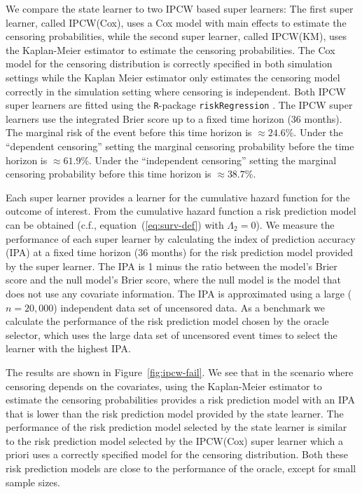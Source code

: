 \documentclass[numsec,webpdf,contemporary,medium,namedate]{oup-authoring-template}%
\theoremstyle{thmstyleone}%
\theoremstyle{thmstyletwo}%
\theoremstyle{thmstylethree}%
\newcommand{\1}{\mathds{1}}
\begin{document}
We compare the state learner to two IPCW based super learners: The
first super learner, called IPCW(Cox), uses a Cox model with main
effects to estimate the censoring probabilities, while the second
super learner, called IPCW(KM), uses the Kaplan-Meier estimator to
estimate the censoring probabilities. The Cox model for the censoring
distribution is correctly specified in both simulation settings while
the Kaplan Meier estimator only estimates the censoring model
correctly in the simulation setting where censoring is
independent. Both IPCW super learners are fitted using the
\texttt{R}-package \texttt{riskRegression}
\citep{Gerds_Ohlendorff_Ozenne_2023}.
%
%
The IPCW super learners use the integrated Brier score up to a fixed time
horizon (36 months). The marginal risk of the event before this time horizon is
\(\approx 24.6\)\%. Under the ``dependent censoring'' setting the marginal
censoring probability before the time horizon is \(\approx 61.9\)\%. Under the
``independent censoring'' setting the marginal censoring probability before this
time horizon is \( \approx 38.7 \)\%.

Each super learner provides a learner for the cumulative hazard function for the
outcome of interest. From the cumulative hazard function a risk prediction model
can be obtained (c.f., equation~(\ref{eq:surv-def}) with $\Lambda_2 = 0$). We
measure the performance of each super learner by calculating the index of
prediction accuracy (IPA) \citep{kattan2018index} at a fixed time horizon (36
months) for the risk prediction model provided by the super learner. The IPA is
1 minus the ratio between the model's Brier score and the null model's Brier
score, where the null model is the model that does not use any covariate
information. The IPA is approximated using a large (\( n = 20,000 \))
independent data set of uncensored data. As a benchmark we calculate the
performance of the risk prediction model chosen by the oracle selector, which
uses the large data set of uncensored event times to select the learner with the
highest IPA.

The results are shown in Figure~\ref{fig:ipcw-fail}. We see that in
the scenario where censoring depends on the covariates, using the
Kaplan-Meier estimator to estimate the censoring probabilities
provides a risk prediction model with an IPA that is lower than the
risk prediction model provided by the state learner. The performance
of the risk prediction model selected by the state learner is similar
to the risk prediction model selected by the IPCW(Cox) super learner
which a priori uses a correctly specified model for the censoring
distribution. Both these risk prediction models are close to the
performance of the oracle, except for small sample sizes.
\end{document}
